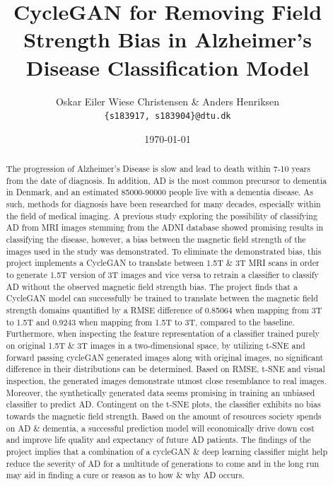 \documentclass[11pt, fleqn, titlepage]{article}
\title{CycleGAN for Removing Field Strength Bias in Alzheimer's Disease Classification Model}
\author{Oskar Eiler Wiese Christensen \& Anders Henriksen \\ \texttt{\{s183917, s183904\}@dtu.dk}}
\date{\today}
\newcommand{\1}[1]{\mathds{1}\left[#1\right]}
\begin{document}
\maketitle
\begin{abstract}
	\small
	\noindent
	The progression of Alzheimer's Disease is slow and lead to death within 7-10 years from the date of diagnosis. In addition, AD is the most common precursor to dementia in Denmark, and an estimated 85000-90000 people live with a dementia disease. \noindent As such, methods for diagnosis have been researched for many decades, especially within the field of medical imaging. 
	\noindent
	A previous study exploring the possibility of classifying AD from MRI images stemming from the ADNI database showed promising results in classifying the disease, however, a bias between the magnetic field strength of the images used in the study was demonstrated. To eliminate the demonstrated bias, this project implements a CycleGAN to translate between 1.5T \& 3T MRI scans in order to generate 1.5T version of 3T images and vice versa to retrain a classifier to classify AD without the observed magnetic field strength bias. The project finds that a CycleGAN model can successfully be trained to translate between the magnetic field strength domains quantified by a RMSE difference of 0.85064 when mapping from 3T to 1.5T and 0.9243 when mapping from 1.5T to 3T, compared to the baseline. Furthermore, when inspecting the feature representation of a classifier trained purely on original 1.5T \& 3T images in a two-dimensional space, by utilizing t-SNE and forward passing cycleGAN generated images along with original images, no significant difference in their distributions can be determined. Based on RMSE, t-SNE and visual inspection, the generated images demonstrate utmost close resemblance to real images. 
	Moreover, the synthetically generated data seems promising in training an unbiased classifier to predict AD. Contingent on the t-SNE plots, the classifier exhibits no bias towards the magnetic field strength.
	Based on the amount of resources society spends on AD \& dementia, a successful prediction model will economically drive down cost and improve life quality and expectancy of future AD patients. 
	\noindent
	The findings of the project implies that a combination of a cycleGAN \& deep learning classifier might help reduce the severity of AD for a multitude of generations to come and in the long run may aid in finding a cure or reason as to how \& why AD occurs. 
	
	

	
\end{abstract}
\end{document}
